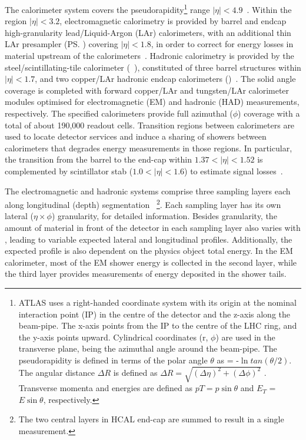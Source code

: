 The calorimeter system covers the pseudorapidity\footnote{ATLAS uses a right-handed coordinate system with its origin at the nominal interaction point (IP) in the centre of the detector and the z-axis along the beam-pipe. The x-axis points from the IP to the centre of the LHC ring, and the y-axis points upward. Cylindrical coordinates (r, $\phi$) are used in the transverse plane, \phi being the azimuthal angle around the beam-pipe. The pseudorapidity is defined in terms of the polar angle $\theta$ as \eta = -$\ln{tan(\theta/2)}$. The angular distance $\Delta R$ is defined as $\Delta R = \sqrt{(\Delta\eta)^{2} + (\Delta\phi)^{2}}$ . Transverse momenta and energies are defined as $pT = p\sin\theta$ and $E_{T}$ = $E\sin\theta$, respectively.} range \(|\eta| < 4.9\)~\cite{PERF-2007-01}. Within the region \(|\eta|< 3.2\),
electromagnetic calorimetry is provided by barrel and endcap high-granularity
lead/Liquid-Argon (LAr) calorimeters, with an additional thin LAr presampler
(\ps) covering \(|\eta| < 1.8\), in order to correct for energy losses in
material upstream of the calorimeters~\cite{LARG-2009-01,larg_tdr}. Hadronic
calorimetry is provided by the steel/scintillating-tile calorimeter
(\tilecal~\cite{TCAL-2017-01,tile_tdr}), constituted of three barrel structures
within \(|\eta| < 1.7\), and two copper/LAr hadronic endcap calorimeters
(\hec)~\cite{cal_tdr}.  The solid angle coverage is completed with forward
copper/LAr and tungsten/LAr calorimeter modules optimised for electromagnetic
(EM) and hadronic (HAD) measurements, respectively. The specified calorimeters
provide full azimuthal ($\phi$) coverage with a total of about 190,000 readout cells. Transition regions between calorimeters are used to locate detector services and induce a sharing of showers between calorimeters that degrades energy measurements in those regions. In particular, the transition from the barrel to the end-cap within
$1.37<|\eta|<1.52$ is complemented by scintillator stab ($1.0<|\eta|<1.6$) to
estimate signal losses~\cite{cal_tdr}.

The electromagnetic and hadronic systems comprise three sampling layers each along longitudinal (depth) segmentation ~\cite{PERF-2007-01}\footnote{The two
central layers in HCAL end-cap are summed to result in a single measurement.}.
Each sampling layer has its own lateral ($\eta\times\phi$) granularity, for detailed information. Besides granularity, the amount of material in front of the detector in each sampling layer also varies with \abseta, leading to variable expected lateral and longitudinal profiles. Additionally, the expected
profile is also dependent on the physics object total energy. In the EM calorimeter, most of the EM shower energy is collected in the second layer, while the third layer provides measurements
of energy deposited in the shower tails. 

